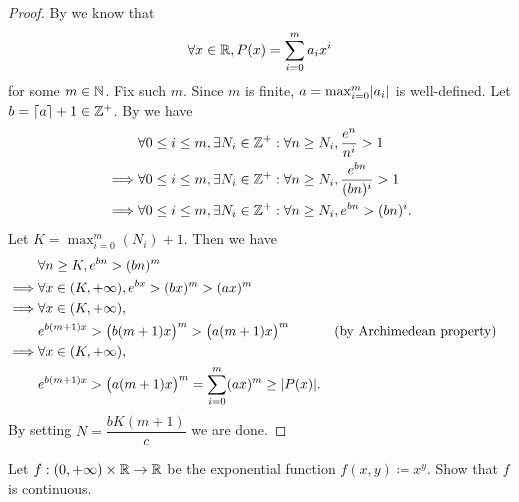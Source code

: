 \begin{proof}
  By  we know that
  \[
    \forall x \in \mathbb{R}, P(x) = \sum_{i = 0}^m a_i x^i
  \]
  for some \(m \in \mathbb{N}\).
  Fix such \(m\).
  Since \(m\) is finite, \(a = \max_{i = 0}^m \abs{a_i}\) is well-defined.
  Let \(b = \left\lceil a\right\rceil + 1 \in \mathbb{Z}^+\).
  By  we have
  \begin{align*}
             & \forall 0 \leq i \leq m, \exists N_i \in \mathbb{Z}^+ : \forall n \geq N_i, \dfrac{e^n}{n^i} > 1       \\
    \implies & \forall 0 \leq i \leq m, \exists N_i \in \mathbb{Z}^+ : \forall n \geq N_i, \dfrac{e^{bn}}{(bn)^i} > 1 \\
    \implies & \forall 0 \leq i \leq m, \exists N_i \in \mathbb{Z}^+ : \forall n \geq N_i, e^{bn} > (bn)^i.
  \end{align*}
  Let \(K = \max_{i = 0}^m(N_i) + 1\).
  Then we have
  \begin{align*}
             & \forall n \geq K, e^{bn} > (bn)^m                                                                                        \\
    \implies & \forall x \in (K, +\infty), e^{bx} > (bx)^m > (ax)^m                                                                     \\
    \implies & \forall x \in (K, +\infty),                                                                                              \\
             & e^{b (m + 1) x} > \big(b (m + 1) x\big)^m > \big(a (m + 1) x\big)^m                &  & \text{(by Archimedean property)} \\
    \implies & \forall x \in (K, +\infty),                                                                                              \\
             & e^{b (m + 1) x} > \big(a (m + 1) x\big)^m = \sum_{i = 0}^m (ax)^m \geq \abs{P(x)}.
  \end{align*}
  By setting \(N = \dfrac{b K (m + 1)}{c}\) we are done.
\end{proof}

\begin{ex}\label{ii:ex:4.5.10}
  Let \(f : (0, +\infty) \times \mathbb{R} \to \mathbb{R}\) be the exponential function \(f(x, y) \coloneqq x^y\).
  Show that \(f\) is continuous.
\end{ex}

